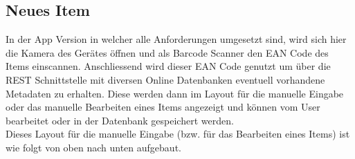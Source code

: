\subsection{Neues Item}
\label{subsec:Item}

In der App Version in welcher alle Anforderungen umgesetzt sind, wird sich hier die Kamera des Gerätes öffnen und als Barcode Scanner den EAN Code des Items einscannen. Anschliessend wird dieser EAN Code genutzt um über die REST Schnittstelle mit diversen Online Datenbanken eventuell vorhandene Metadaten zu erhalten. Diese werden dann im Layout für die manuelle Eingabe oder das manuelle Bearbeiten eines Items angezeigt und können vom User bearbeitet oder in der Datenbank gespeichert werden.\\

Dieses Layout für die manuelle Eingabe (bzw. für das Bearbeiten eines Items) ist wie folgt von oben nach unten aufgebaut.

